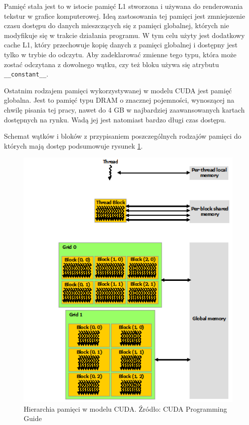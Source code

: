 Pamięć stała jest to w istocie pamięć L1 stworzona i używana do renderowania tekstur 
w grafice komputerowej. Ideą zastosowania tej pamięci jest zmniejszenie czasu
dostępu do danych mieszczących się z pamięci globalnej, których nie modyfikuje się w trakcie działania programu.
W tym celu użyty jest dodatkowy cache L1, który przechowuje kopię danych 
z pamięci globalnej i dostępny jest tylko w trybie do odczytu.
Aby zadeklarować zmienne tego typu, która może zostać odczytana z dowolnego
wątku, czy też bloku używa się atrybutu \texttt{\_\_constant\_\_}.

Ostatnim rodzajem pamięci wykorzystywanej w modelu CUDA jest pamięć globalna.
Jest to pamięć typu DRAM o znacznej pojemności, wynoszącej na chwilę pisania tej
pracy, nawet do 4 GB w najbardziej zaawansowanych kartach dostępnych na rynku. 
Wadą jej jest natomiast bardzo długi czas dostępu.

Schemat wątków i bloków z przypisaniem poszczególnych rodzajów pamięci do których
mają dostęp podsumowuje rysunek \ref{hier}.

\begin{figure}[ht]
\centering
\includegraphics[scale=0.8]{images/memory-hierarchy.png}
\caption{Hierarchia pamięci w modelu CUDA. Źródło: CUDA Programming Guide}
\label{hier}
\end{figure}

